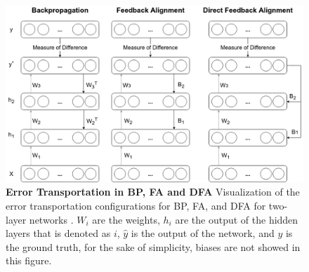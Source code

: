 \documentclass[a4paper, nobind]{templates/ociamthesis}
\begin{document}
\begin{figure}

{\centering \includegraphics[width=1\linewidth]{figures/1_ErrorPropagation} 

}

\caption[Error Transportation in BP, FA and DFA]{\textbf{Error Transportation in BP, FA and DFA} \newline Visualization of the error transportation configurations for BP, FA, and DFA for two-layer networks \cite{nøkland2016direct}. $W_i$ are the weights, $h_i$ are the output of the hidden layers that is denoted as $i$, $\hat{y}$ is the output of the network, and $y$ is the ground truth, for the sake of simplicity, biases are not showed in this figure.}\label{fig:Error-Propagation}
\end{figure}
\end{document}
